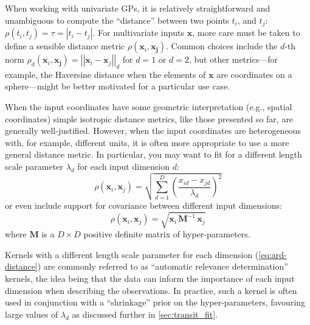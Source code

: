 \documentclass[letterpaper]{ar-1col}
\newcommand{\dt}{\ensuremath{\tau}}
\newcommand{\lengthscale}{\ensuremath{\lambda}}
\begin{document}
When working with univariate GPs, it is relatively straightforward and unambiguous to compute the ``distance'' between two points $t_i$, and $t_j$: $\rho(t_i,t_j) = \dt = \left|t_i - t_j\right|$.
For multivariate inputs $\boldsymbol{x}$, more care must be taken to define a sensible distance metric $\rho(\boldsymbol{x}_i,\boldsymbol{x_j})$.
Common choices include the $d$-th norm $\rho_d(\boldsymbol{x}_i,\boldsymbol{x_j}) = \left|\left|\boldsymbol{x}_i - \boldsymbol{x}_j\right|\right|_d$ for $d=1$ or $d=2$, but other metrics---for example, the Haversine distance when the elements of $\boldsymbol{x}$ are coordinates on a sphere---might be better motivated for a particular use case.

When the input coordinates have some geometric interpretation (e.g., spatial coordinates) simple isotropic distance metrics, like those presented so far, are generally well-justified.
However, when the input coordinates are heterogeneous with, for example, different units, it is often more appropriate to use a more general distance metric.
In particular, you may want to fit for a different length scale parameter $\lengthscale_d$ for each input dimension $d$:
\begin{equation}\label{eq:ard-distance}
  \rho(\boldsymbol{x}_i,\boldsymbol{x}_j) = \sqrt{\sum_{d=1}^D \left(\frac{x_{id} - x_{jd}}{\lengthscale_d}\right)^2}
\end{equation}
or even include support for covariance between different input dimensions:
\begin{equation}
  \rho(\boldsymbol{x}_i,\boldsymbol{x}_j) = \sqrt{\boldsymbol{x}_i\,\boldsymbol{M}^{-1}\,\boldsymbol{x}_j}
\end{equation}
where $\boldsymbol{M}$ is a $D\times D$ positive definite matrix of hyper-parameters.

Kernels with a different length scale parameter for each dimension (\autoref{eq:ard-distance}) are commonly referred to as ``automatic relevance determination'' \citep[ARD;][]{gpml} kernels, the idea being that the data can inform the importance of each input dimension when describing the observations.
In practice, such a kernel is often used in conjunction with a ``shrinkage'' prior on the hyper-parameters, favouring large values of $\lengthscale_d$ as discussed further in \autoref{sec:transit_fit}.
\begin{armarginnote}[]
\end{armarginnote}
\end{document}

